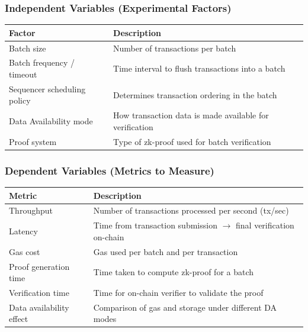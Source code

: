 \subsubsection{Independent Variables (Experimental Factors)}
\begin{center}
\begin{tabular}{|p{4.5cm}|p{8cm}|}
    \hline
    \textbf{Factor} & \textbf{Description} \\
    \hline
    Batch size & Number of transactions per batch \\
    \hline
    Batch frequency / timeout & Time interval to flush transactions into a batch \\
    \hline
    Sequencer scheduling policy & Determines transaction ordering in the batch \\
    \hline
    Data Availability mode & How transaction data is made available for verification \\
    \hline
    Proof system & Type of zk-proof used for batch verification \\
    \hline
\end{tabular}
\end{center}

\vspace{1cm}

\subsubsection{Dependent Variables (Metrics to Measure)}
\begin{center}
\begin{tabular}{|p{4.5cm}|p{8cm}|}
    \hline
    \textbf{Metric} & \textbf{Description} \\
    \hline
    Throughput & Number of transactions processed per second (tx/sec) \\
    \hline
    Latency & Time from transaction submission $\rightarrow$ final verification on-chain \\
    \hline
    Gas cost & Gas used per batch and per transaction \\
    \hline
    Proof generation time & Time taken to compute zk-proof for a batch \\
    \hline
    Verification time & Time for on-chain verifier to validate the proof \\
    \hline
    Data availability effect & Comparison of gas and storage under different DA modes \\
    \hline
\end{tabular}
\end{center}

